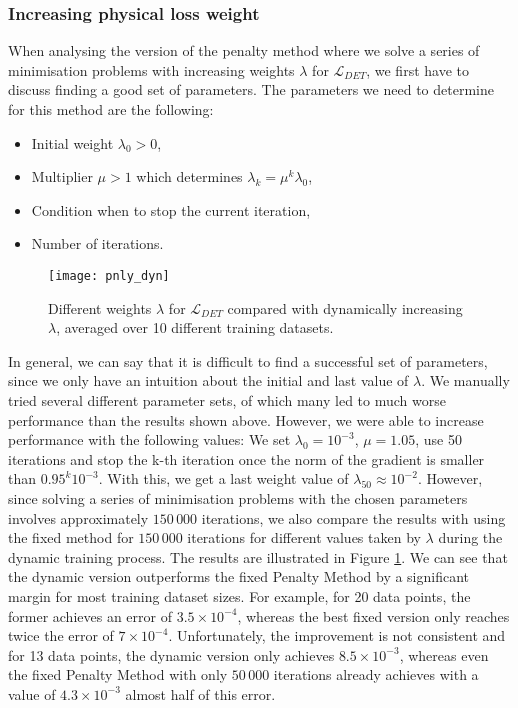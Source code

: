 \subsubsection{Increasing physical loss weight}
When analysing the version of the penalty method where we solve a series of minimisation problems with increasing weights $\lambda$ for $\mathcal{L}_{DET}$, we first have to discuss finding a good set of parameters. The parameters we need to determine for this method are the following:
\begin{itemize}
	\item Initial weight $\lambda_0 > 0$,
	\item Multiplier $\mu > 1$ which determines $\lambda_k = \mu^k\lambda_0$,
	\item Condition when to stop the current iteration,
	\item Number of iterations.
\end{itemize}
\begin{figure}[H]
	\texttt{[image: pnly\_dyn]}
	\caption{Different weights $\lambda$ for $\mathcal{L}_{DET}$ compared with dynamically increasing $\lambda$, averaged over 10 different training datasets.}
	\label{fig:pnly_dyn}
\end{figure}
In general, we can say that it is difficult to find a successful set of parameters, since we only have an intuition about the initial and last value of $\lambda$. We manually tried several different parameter sets, of which many led to much worse performance than the results shown above. However, we were able to increase performance with the following values: We set $\lambda_0 = 10^{-3}$, $\mu = 1.05$, use 50 iterations and stop the k-th iteration once the norm of the gradient is smaller than $0.95^{k} 10^{-3}$. With this, we get a last weight value of $\lambda_{50} \approx 10^{-2}$. However, since solving a series of minimisation problems with the chosen parameters involves approximately $150\,000$ iterations, we also compare the results with using the fixed method for $150\,000$ iterations for different values taken by $\lambda$ during the dynamic training process. The results are illustrated in Figure \ref{fig:pnly_dyn}. We can see that the dynamic version outperforms the fixed Penalty Method by a significant margin for most training dataset sizes. For example, for 20 data points, the former achieves an error of $3.5\times 10^{-4}$, whereas the best fixed version only reaches twice the error of $7\times 10^{-4}$. Unfortunately, the improvement is not consistent and for 13 data points, the dynamic version only achieves $8.5 \times 10^{-3}$, whereas even the fixed Penalty Method with only $50\,000$ iterations already achieves with a value of $4.3 \times 10^{-3}$ almost half of this error.

